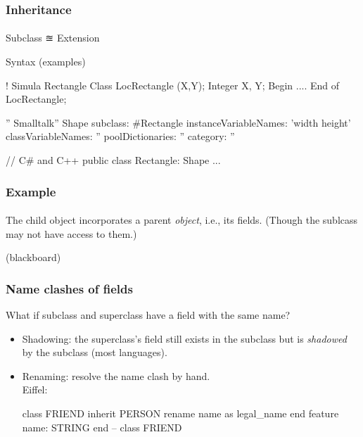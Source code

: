 \documentclass{beamer}
\begin{document}
\begin{frame}[fragile]
\frametitle{Inheritance}
\framesubtitle{}
Subclass ≊ Extension
\bigskip

Syntax (examples)

\begin{cplus3}
    ! Simula
    Rectangle Class LocRectangle (X,Y); Integer X, Y;
    Begin .... 
    End of LocRectangle;

    '' Smalltalk''
    Shape subclass: #Rectangle
        instanceVariableNames: 'width height'
        classVariableNames: ''
        poolDictionaries: ''
        category: ''

     // C# and C++
     public class Rectangle: Shape 
     {
        ... 
     }

\end{cplus3}


\end{frame}


\begin{frame}[fragile]
\frametitle{Example}
\framesubtitle{}
\bigskip

The child object incorporates a parent \textit{object}, i.e., its fields.
(Though the sublcass may not have access to them.)

(blackboard)

\end{frame}

\begin{frame}[fragile]
\frametitle{Name clashes of fields }

What if subclass and superclass have a field with the same name?
\begin{itemize}
\item Shadowing: the superclass's field still exists in the subclass but is
\textit{shadowed} by the subclass (most languages).
\item Renaming: resolve the name clash by hand. \\
Eiffel:
\begin{eiffel}
class
   FRIEND
inherit
    PERSON
       rename
           name as legal_name
       end
feature
     name: STRING
end -- class FRIEND

\end{eiffel}
\end{itemize}
\end{frame}
\end{document}
